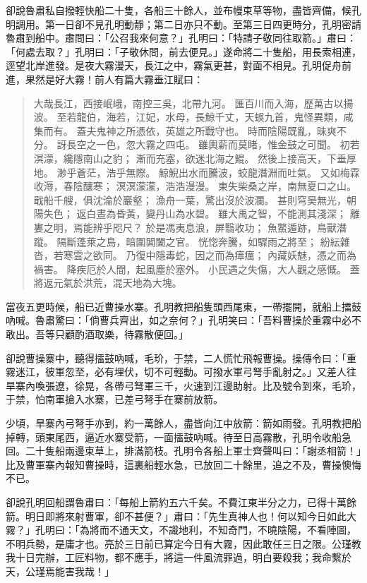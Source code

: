 卻說魯肅私自撥輕快船二十隻，各船三十餘人，並布幔束草等物，盡皆齊備，候孔明調用。第一日卻不見孔明動靜；第二日亦只不動。至第三日四更時分，孔明密請魯肅到船中。肅問曰：「公召我來何意？」孔明曰：「特請子敬同往取箭。」肅曰：「何處去取？」孔明曰：「子敬休問，前去便見。」遂命將二十隻船，用長索相連，逕望北岸進發。是夜大霧漫天，長江之中，霧氣更甚，對面不相見。孔明促舟前進，果然是好大霧！前人有篇大霧垂江賦曰：

\begin{quote}
大哉長江，西接岷峨，南控三吳，北帶九河。
匯百川而入海，歷萬古以揚波。
至若龍伯，海若，江妃，水母，長鯨千丈，天蜈九首，鬼怪異類，咸集而有。
蓋夫鬼神之所憑依，英雄之所戰守也。
時而陰陽既亂，昧爽不分。
訝長空之一色，忽大霧之四屯。
雖輿薪而莫睹，惟金鼓之可聞。
初若溟濛，纔隱南山之豹；
漸而充塞，欲迷北海之鯤。
然後上接高天，下垂厚地。
渺乎蒼茫，浩乎無際。
鯨鯢出水而騰波，蛟龍潛淵而吐氣。
又如梅霖收溽，春陰釀寒；
溟溟濛濛，浩浩漫漫。
東失柴桑之岸，南無夏口之山。
戢船千艘，俱沈淪於巖壑；
漁舟一葉，驚出沒於波瀾。
甚則穹昊無光，朝陽失色；
返白晝為昏黃，變丹山為水碧。
雖大禹之智，不能測其淺深；
離婁之明，焉能辨乎咫尺？
於是馮夷息浪，屏翳收功；
魚鱉遁跡，鳥獸潛蹤。
隔斷蓬萊之島，暗圍閶闔之官。
恍惚奔騰，如驟雨之將至；
紛紜雜沓，若寒雲之欲同。
乃復中隱毒蛇，因之而為瘴癘；
內藏妖魅，憑之而為禍害。
降疾厄於人間，起風塵於塞外。
小民遇之失傷，大人觀之感慨。
蓋將返元氣於洪荒，混天地為大塊。
\end{quote}

當夜五更時候，船已近曹操水寨。孔明教把船隻頭西尾東，一帶擺開，就船上擂鼓吶喊。魯肅驚曰：「倘曹兵齊出，如之奈何？」孔明笑曰：「吾料曹操於重霧中必不敢出。吾等只顧酌酒取樂，待霧散便回。」

卻說曹操寨中，聽得擂鼓吶喊，毛玠，于禁，二人慌忙飛報曹操。操傳令曰：「重霧迷江，彼軍忽至，必有埋伏，切不可輕動。可撥水軍弓弩手亂射之。」又差人往旱寨內喚張遼，徐晃，各帶弓弩軍三千，火速到江邊助射。比及號令到來，毛玠，于禁，怕南軍搶入水寨，已差弓弩手在寨前放箭。

少頃，旱寨內弓弩手亦到，約一萬餘人，盡皆向江中放箭：箭如雨發。孔明教把船掉轉，頭東尾西，逼近水寨受箭，一面擂鼓吶喊。待至日高霧散，孔明令收船急回。二十隻船兩邊束草上，排滿箭枝。孔明令各船上軍士齊聲叫曰：「謝丞相箭！」比及曹軍寨內報知曹操時，這裏船輕水急，已放回二十餘里，追之不及，曹操懊悔不已。

卻說孔明回船謂魯肅曰：「每船上箭約五六千矣。不費江東半分之力，已得十萬餘箭。明日即將來射曹軍，卻不甚便？」肅曰：「先生真神人也！何以知今日如此大霧？」孔明曰：「為將而不通天文，不識地利，不知奇門，不曉陰陽，不看陣圖，不明兵勢，是庸才也。亮於三日前已算定今日有大霧，因此敢任三日之限。公瑾教我十日完辦，工匠料物，都不應手，將這一件風流罪過，明白要殺我；我命繫於天，公瑾焉能害我哉！」

